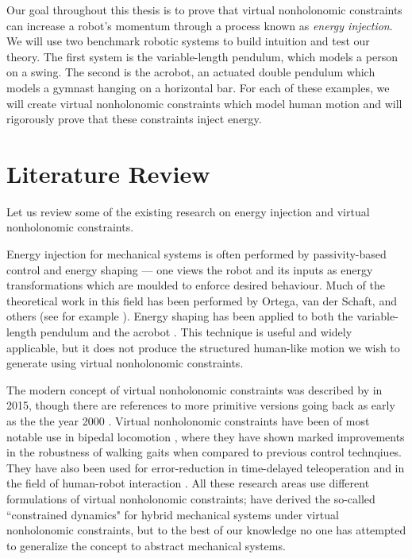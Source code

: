 Our goal throughout this thesis is to prove that virtual
nonholonomic constraints can increase a robot's momentum through a
process known as \textit{energy injection}.
We will use two benchmark robotic systems to build intuition and test
our theory.
The first system is the variable-length pendulum, which models a person
on a swing.
The second is the acrobot, an actuated double pendulum which models a gymnast
hanging on a horizontal bar.
For each of these examples, we will create virtual nonholonomic
constraints which model human motion and will rigorously prove that these
constraints inject energy. 

\section{Literature Review}
Let us review some of the existing research on energy injection and virtual
nonholonomic constraints.

Energy injection for mechanical systems is often performed by passivity-based
control and energy shaping --- one views the robot and its inputs as energy
transformations which are moulded to enforce desired behaviour.
Much of the theoretical work in this field has been performed by Ortega, van der
Schaft, and others (see for example \cite{ida_pbc_underactuation_one,
ida_pbc_acrobot_example,energy_shaping_revisited}).
Energy shaping has been applied to both the variable-length
pendulum \cite{vlp_energy_shaping} and the acrobot
\cite{swingup_acrobot_energy,swingup_giant_acrobot}.
This technique is useful and widely applicable, but it does not
produce the structured human-like motion we wish to generate using virtual
nonholonomic constraints.

The modern concept of virtual nonholonomic constraints was described by
\citet{nhvc_dynamic_walking} in 2015, though there are references to more
primitive versions going back as early as the the year 2000
\cite{vnhc_human_robot_cooperation}.
Virtual nonholonomic constraints have been of most notable use in
bipedal locomotion \cite{nhvc_incline_walking,output_nhvc_bipedal_control},
where they have shown marked improvements in the robustness of walking gaits
when compared to previous control technqiues.
They have also been used for error-reduction in time-delayed teleoperation
\cite{vnhc_time_delay_teleop} and in the field of human-robot interaction
\cite{psd_based_vnhc_redundant_manipulator,haptic_vnhc}.
All these research areas use different formulations of virtual nonholonomic constraints;
\citet{hybrid_zero_dynamics_bipedal_nhvcs} have derived the so-called
``constrained dynamics" for hybrid mechanical systems under virtual nonholonomic
constraints, but to the best of our knowledge no one has attempted to generalize
the concept to abstract mechanical systems.

